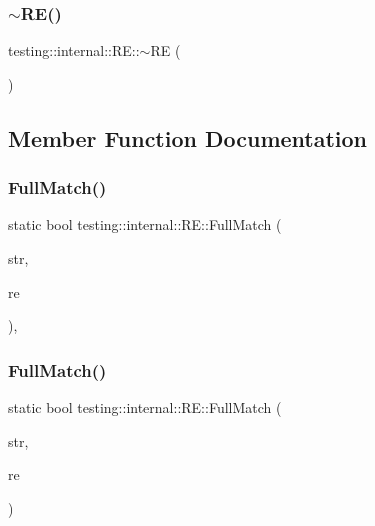 \mbox{\label{classtesting_1_1internal_1_1RE_af3ad18e6c0b433f3d85ed23eda8119f3}} 
\subsubsection{\texorpdfstring{$\sim$RE()}{~RE()}}
{\footnotesize\ttfamily testing\+::internal\+::\+R\+E\+::$\sim$\+RE (\begin{DoxyParamCaption}{ }\end{DoxyParamCaption})}



\subsection{Member Function Documentation}
\mbox{\label{classtesting_1_1internal_1_1RE_aa79a950758d0f1d62f7762d1e9cefe86}} 
\subsubsection{\texorpdfstring{FullMatch()}{FullMatch()}\hspace{0.1cm}{\footnotesize\ttfamily [1/2]}}
{\footnotesize\ttfamily static bool testing\+::internal\+::\+R\+E\+::\+Full\+Match (\begin{DoxyParamCaption}\item[{const \+::std\+::string \&}]{str,  }\item[{const \mbox{\hyperlink{classtesting_1_1internal_1_1RE}{RE}} \&}]{re }\end{DoxyParamCaption})\hspace{0.3cm}{\ttfamily [inline]}, {\ttfamily [static]}}

\mbox{\label{classtesting_1_1internal_1_1RE_a2b13ec1f6ccd6c32f7efa01e21588f0b}} 
\subsubsection{\texorpdfstring{FullMatch()}{FullMatch()}\hspace{0.1cm}{\footnotesize\ttfamily [2/2]}}
{\footnotesize\ttfamily static bool testing\+::internal\+::\+R\+E\+::\+Full\+Match (\begin{DoxyParamCaption}\item[{const char $\ast$}]{str,  }\item[{const \mbox{\hyperlink{classtesting_1_1internal_1_1RE}{RE}} \&}]{re }\end{DoxyParamCaption})\hspace{0.3cm}{\ttfamily [static]}}


